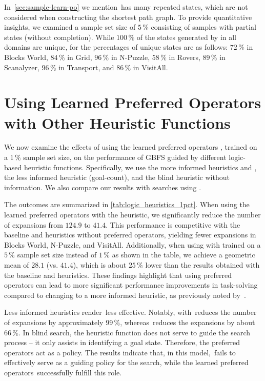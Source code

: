 \documentclass[ppgc,diss,english]{iiufrgs}
\begin{document}
In~\cref{sec:sample-learn-po} we mention~\bfsrw has many repeated states, which are not considered when constructing the shortest path graph. To provide quantitative insights, we examined a sample set size of $5\,\%$ consisting of samples with partial states (without completion). While $100\,\%$ of the states generated by \bfsrs in all domains are unique, for \bfsrw the percentages of unique states are as follows: $72\,\%$ in Blocks World, $84\,\%$ in Grid, $96\,\%$ in N-Puzzle, $58\,\%$ in Rovers, $89\,\%$ in Scanalyzer, $96\,\%$ in Transport, and $86\,\%$ in VisitAll.




\section{Using Learned Preferred Operators with Other Heuristic Functions}
\label{sec:other-heuristic-functions}
We now examine the effects of using the learned preferred operators \pog, trained on a $1\,\%$ sample set size, on the performance of GBFS guided by different logic-based heuristic functions. Specifically, we use the more informed heuristics \hff and \hadd, the less informed heuristic \hgc (goal-count), and the blind heuristic \hblind without information. We also compare our results with searches using \poff.

The outcomes are summarized in \cref{tab:logic_heuristics_1pct}. When using the learned preferred operators \pog with the \hgc heuristic, we significantly reduce the number of expansions from $124.9$ to $41.4$. This performance is competitive with the baseline \hff and \hadd heuristics without preferred operators, yielding fewer expansions in Blocks World, N-Puzzle, and VisitAll. Additionally, when using \hgc with \pog trained on a $5\,\%$ sample set size instead of $1\,\%$ as shown in the table, we achieve a geometric mean of $28.1$ (vs. $41.4$), which is about $25\,\%$ lower than the results obtained with the baseline \hff and \hadd heuristics. These findings highlight that using preferred operators can lead to more significant performance improvements in task-solving compared to changing to a more informed heuristic, as previously noted by~\citet{Correa.etal/2022}.



Less informed heuristics render~\poff less effective. Notably, \hblind with~\pog reduces the number of expansions by approximately $99\,\%$, whereas~\poff reduces the expansions by about $66\,\%$. In blind search, the heuristic function does not serve to guide the search process -- it only assists in identifying a goal state. Therefore, the preferred operators act as a policy. The results indicate that, in this model,~\poff fails to effectively serve as a guiding policy for the search, while the learned preferred operators~\pog successfully fulfill this role.
\end{document}
